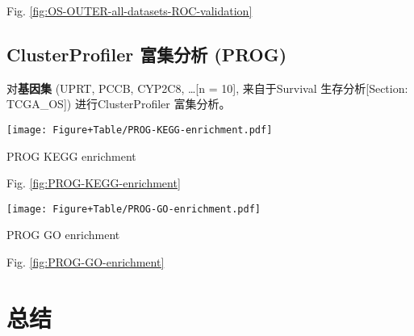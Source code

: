 \documentclass[
]{article}
\begin{document}
\begin{center}\vspace{1.5cm}\end{center}

Fig. \ref{fig:OS-OUTER-all-datasets-ROC-validation}

\hypertarget{clusterprofiler-ux5bccux96c6ux5206ux6790-prog}{%
\subsection{ClusterProfiler 富集分析 (PROG)}\label{clusterprofiler-ux5bccux96c6ux5206ux6790-prog}}

对\textbf{基因集} (UPRT, PCCB, CYP2C8, \ldots{[}n = 10{]}, 来自于Survival 生存分析{[}Section: TCGA\_OS{]}) 进行ClusterProfiler 富集分析。

\begin{center}\vspace{1.5cm}\end{center}
\def\@captype{figure}
\begin{center}
\texttt{[image: Figure+Table/PROG-KEGG-enrichment.pdf]}
\caption{PROG KEGG enrichment}\label{fig:PROG-KEGG-enrichment}
\end{center}

\begin{center}\vspace{1.5cm}\end{center}

Fig. \ref{fig:PROG-KEGG-enrichment}

\begin{center}\vspace{1.5cm}\end{center}
\def\@captype{figure}
\begin{center}
\texttt{[image: Figure+Table/PROG-GO-enrichment.pdf]}
\caption{PROG GO enrichment}\label{fig:PROG-GO-enrichment}
\end{center}

\begin{center}\vspace{1.5cm}\end{center}

Fig. \ref{fig:PROG-GO-enrichment}

\hypertarget{conclusion}{%
\section{总结}\label{conclusion}}
\end{document}
